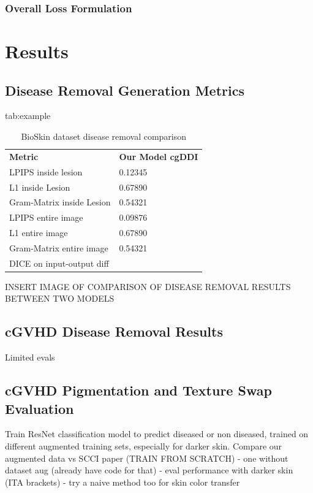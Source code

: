 \documentclass{midl} %
\begin{document}
\subsubsection{Overall Loss Formulation}


\section{Results}
\subsection{Disease Removal Generation Metrics}



\begin{table}[htbp]
\floatconts
  {tab:example}%
  {\caption{BioSkin dataset disease removal comparison}}%
  {\begin{tabular}{ll}
  \bfseries Metric & \bfseries Our Model \bfseries cgDDI \\
  LPIPS inside lesion & 0.12345\\
  L1 inside Lesion & 0.67890\\
  Gram-Matrix inside Lesion & 0.54321\\
  LPIPS entire image & 0.09876 \\
  L1 entire image & 0.67890\\
  Gram-Matrix entire image & 0.54321\\
  DICE on input-output diff & \\ 
  
  \end{tabular}}
\end{table}
INSERT IMAGE OF COMPARISON OF DISEASE REMOVAL RESULTS BETWEEN TWO MODELS

\subsection{cGVHD Disease Removal Results}
Limited evals


\subsection{cGVHD Pigmentation and Texture Swap Evaluation}
Train ResNet classification model to predict diseased or non diseased, trained on different augmented training sets, especially for darker skin.
Compare our augmented data vs SCCI \cite{yang_automated_2027}  paper (TRAIN FROM SCRATCH) 
- one without dataset aug (already have code for that)
- eval performance with darker skin (ITA brackets)
- try a naive method too for skin color transfer 
\end{document}
